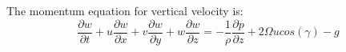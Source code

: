 \documentclass{article}
\begin{document}
The momentum equation for vertical velocity is:  
        \begin{equation}
        \frac{\partial w}{\partial t} + u\frac{\partial w }{\partial x} + v\frac{\partial w}{\partial y} + w\frac{\partial w}{\partial z}=-\frac{1}{\rho}\frac{\partial p}{\partial z}+2\Omega u cos(\gamma) -g
        \end{equation}
        
\end{document}
